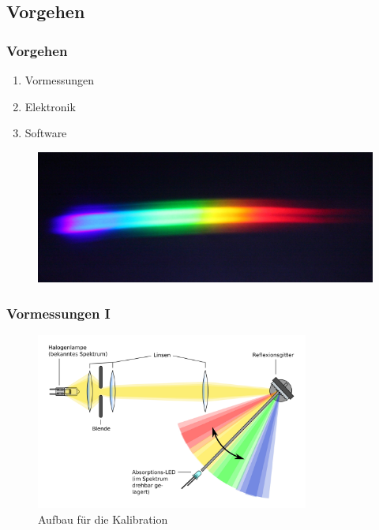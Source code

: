 \documentclass[10pt]{beamer}
\begin{document}
\subsection[]{Vorgehen}
\frame
{
\frametitle{Vorgehen}
\begin{enumerate}
\item Vormessungen
\item Elektronik
\item Software 
\end{enumerate}

\begin{figure}
\begin{center}
\includegraphics[width=\textwidth]{./images/spektrum_web.jpg}
\end{center}
\end{figure}
}
\frame
{
\frametitle{Vormessungen I}
\begin{figure}
\begin{center}
\includegraphics[width=0.8\textwidth]{./images/setup.jpg}
\caption{Aufbau f\"ur die Kalibration}
\end{center}
\end{figure}
}
\frame
\end{document}
